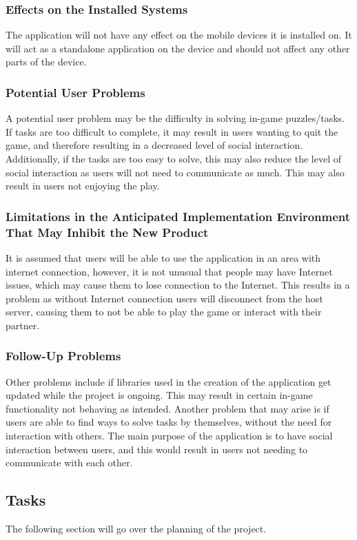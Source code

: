 \documentclass[12pt]{article}
\begin{document}
\subsubsection{Effects on the Installed Systems}
The application will not have any effect on the mobile devices it is installed on. It will act as a standalone application on the device and should not affect any other parts of the device.

\subsubsection{Potential User Problems}
A potential user problem may be the difficulty in solving in-game puzzles/tasks. If tasks are too difficult to complete, it may result in users wanting to quit the game, and therefore resulting in a decreased level of social interaction. Additionally, if the tasks are too easy to solve, this may also reduce the level of social interaction as users will not need to communicate as much. This may also result in users not enjoying the play.

\subsubsection{Limitations in the Anticipated Implementation Environment That May Inhibit the New Product}
It is assumed that users will be able to use the application in an area with internet connection, however, it is not unusual that people may have Internet issues, which may cause them to lose connection to the Internet. This results in a problem as without Internet connection users will disconnect from the host server, causing them to not be able to play the game or interact with their partner.

\subsubsection{Follow-Up Problems}
Other problems include if libraries used in the creation of the application get updated while the project is ongoing. This may result in certain in-game functionality not behaving as intended. Another problem that may arise is if users are able to find ways to solve tasks by themselves, without the need for interaction with others. The main purpose of the application is to have social interaction between users, and this would result in users not needing to communicate with each other.

\subsection{Tasks}
The following section will go over the planning of the project.
\end{document}
